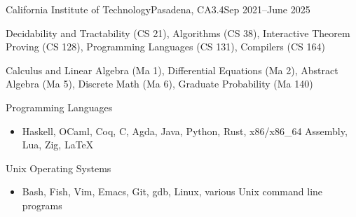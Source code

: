 \documentclass[a4paper]{article}
\begin{document}

    \begin{school}{California Institute of Technology}{Pasadena, CA}{3.4}{Sep 2021--June 2025}
        \item Decidability and Tractability (CS 21), Algorithms (CS 38), Interactive Theorem Proving (CS 128), Programming Languages (CS 131), Compilers (CS 164)
        \item Calculus and Linear Algebra (Ma 1), Differential Equations (Ma 2), Abstract Algebra (Ma 5), Discrete Math (Ma 6), Graduate Probability (Ma 140)
    \end{school}


    \begin{skill}{Programming Languages}
      \begin{itemize}[nosep]
        \item Haskell, OCaml, Coq, C, Agda, Java, Python, Rust, x86/x86\_64 Assembly, Lua, Zig, \LaTeX{}
      \end{itemize}
    \end{skill}
    \vspace{-8pt}
    \begin{skill}{Unix Operating Systems}
      \begin{itemize}[nosep]
        \item Bash, Fish, Vim, Emacs, Git, gdb, Linux, various Unix command line programs
     \end{itemize}
    \end{skill}
    \vspace{-5pt}
\end{document}
